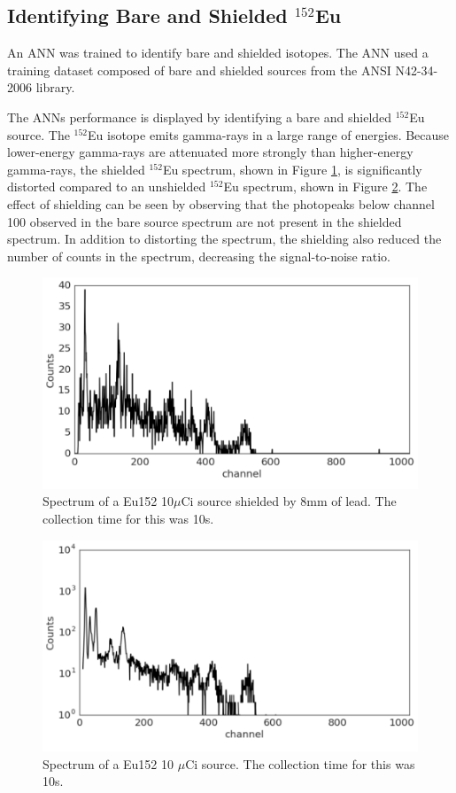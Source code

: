 \documentclass[tocnosub,noragright,centerchapter,12pt,fullpage]{uiucecethesis09}
\begin{document}
\subsection{Identifying Bare and Shielded $^{152}$Eu}

An ANN was trained to identify bare and shielded isotopes. The ANN used a training dataset composed of bare and shielded sources from the ANSI N42-34-2006 library.

The ANNs performance is displayed by identifying a bare and shielded $^{152}$Eu source. The $^{152}$Eu isotope emits gamma-rays in a large range of energies. Because lower-energy gamma-rays are attenuated more strongly than higher-energy gamma-rays, the shielded $^{152}$Eu spectrum, shown in Figure \ref{fig:Shielded_Eu152}, is significantly distorted compared to an unshielded $^{152}$Eu spectrum, shown in Figure \ref{fig:Bare_Eu152}. The effect of shielding can be seen by observing that the photopeaks below channel 100 observed in the bare source spectrum are not present in the shielded spectrum. In addition to distorting the spectrum, the shielding also reduced the number of counts in the spectrum, decreasing the signal-to-noise ratio. 

\begin{figure}[H]
\centering
\includegraphics[width=0.75\linewidth]{images/Shielded_Eu152}
    \caption{Spectrum of a Eu152 10$\mu$Ci source shielded by 8mm of lead. The collection time for this was 10s.}
\label{fig:Shielded_Eu152}
\end{figure}

\begin{figure}[H]
\centering
\includegraphics[width=0.75\linewidth]{images/Bare_Eu152}
\caption{Spectrum of a Eu152 10 $\mu$Ci source. The collection time for this was 10s.}
\label{fig:Bare_Eu152}
\end{figure}
\end{document}
